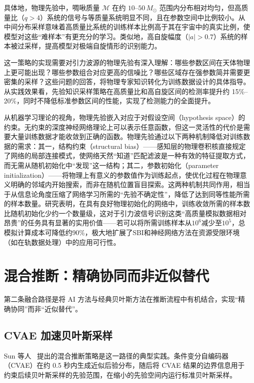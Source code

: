具体地，物理先验中，啁啾质量 $\mathcal{M}$ 在约 $10$--$50\,M_\odot$ 范围内分布相对均匀，但高质量比（$q > 4$）系统的信号与等质量系统明显不同，且在参数空间中比例较小。从中间分布采样意味着高质量比系统的训练样本比例高于其在宇宙中的真实比例，使模型对这些“难样本”有更充分的学习。类似地，高自旋幅度（$|a| > 0.7$）系统的样本被过采样，提高模型对极端自旋情形的识别能力。

这一策略的实现需要对引力波源的物理先验有深入理解：哪些参数区间在天体物理上更可能出现？哪些参数组合对应更高的信噪比？哪些区域存在强参数简并需要更密集的采样？这些问题的回答，将物理专家知识转化为训练数据设计的具体指导。从实践效果看，先验知识采样策略在高质量比和高自旋区间的检测率提升约 15\%--20\%，同时不降低标准参数区间的性能，实现了检测能力的全面提升。

从机器学习理论的视角，物理先验嵌入对应于对假设空间（hypothesis space）的约束。无约束的深度神经网络理论上可以表示任意函数，但这一灵活性的代价是需要大量训练数据才能收敛到正确的函数。物理先验通过以下两种机制降低对训练数据的需求：其一，结构约束（structural bias）——感知层的物理卷积核直接规定了网络的局部连接模式，使网络天然“知道”匹配滤波是一种有效的特征提取方式，而无需从随机初始化中“发现”这一结构；其二，参数初始化（parameter initialization）——将物理上有意义的参数值作为训练起点，使优化过程在物理意义明确的邻域内开始搜索，而非在随机位置盲目探索。这两种机制共同作用，相当于从信息论角度压缩了网络学习所需的“先验不确定性”，降低了达到同等性能所需的样本数量。研究表明，在具有良好物理初始化的网络中，训练收敛所需的样本数比随机初始化少约一个数量级，这对于引力波信号识别这类“高质量模拟数据相对昂贵”的任务具有显著的实用价值——若可以将所需训练样本从$10^6$减少至$10^5$，总模拟计算成本可降低约90\%，极大地扩展了SBI和神经网络方法在资源受限环境（如在轨数据处理）中的应用可行性。

\section{混合推断：精确协同而非近似替代}

第二条融合路径是将 AI 方法与经典贝叶斯方法在推断流程中有机结合，实现“精确协同”而非“近似替代”。

\subsection{CVAE 加速贝叶斯采样}

Sun 等人~\cite{sun2025cvae} 提出的混合推断策略是这一路径的典型实践。条件变分自编码器（CVAE）在约 0.5 秒内生成近似后验分布，随后将 CVAE 结果的边界信息用于约束后续贝叶斯采样的先验范围，在缩小的先验空间内运行标准贝叶斯采样。

